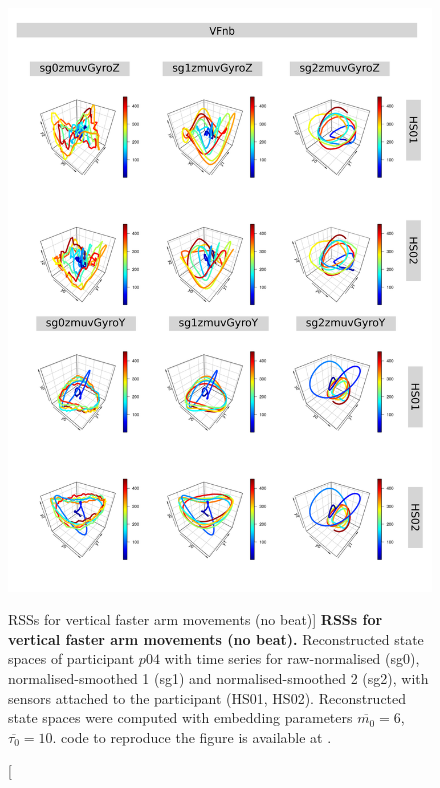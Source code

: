 \begin{figure}
\centering
\includegraphics[height=0.8\textheight]{rss_VFnb_p04}
\caption
	[RSSs for vertical faster arm movements (no beat)]{
	{\bf RSSs for vertical faster arm movements (no beat).}
	Reconstructed state spaces of participant $p04$
	with time series for raw-normalised (sg0), 
	normalised-smoothed 1 (sg1) and 
	normalised-smoothed 2 (sg2), 
	with sensors attached to the participant (HS01, HS02).
	Reconstructed state spaces were computed with 
	embedding parameters $\overline{m_0}=6$, $\overline{\tau_0}=10$.
		\R code to reproduce the figure is available at 
		.
        }
     \label{fig:rss_VFnb_p04}
\end{figure}




